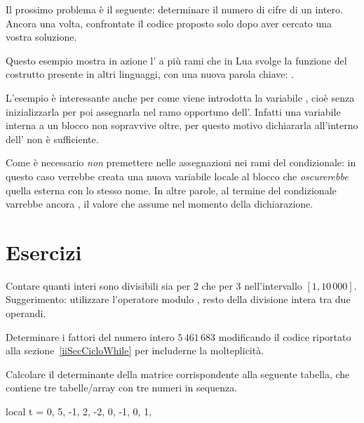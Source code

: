 Il prossimo problema è il seguente: determinare il numero di cifre di un
intero. Ancora una volta, confrontate il codice proposto solo dopo aver cercato
una vostra soluzione.

Questo esempio mostra in azione l' a più rami che in Lua svolge
la funzione del costrutto  presente in altri linguaggi, con una
nuova parola chiave: .

L'esempio è interessante anche per come viene introdotta la variabile
, cioè senza inizializzarla per poi assegnarla nel ramo opportuno
dell'. Infatti una variabile interna a un blocco non sopravvive oltre,
per questo motivo dichiararla all'interno dell' non è sufficiente.

Come è necessario \emph{non} premettere  nelle
assegnazioni nei rami del condizionale: in questo caso verrebbe creata una nuova
variabile locale al blocco che \emph{oscurerebbe} quella esterna con lo stesso
nome. In altre parole, al termine del condizionale  varrebbe ancora
, il valore che assume nel momento della dichiarazione.


\section{Esercizi}

\begin{Exercise}[label=cos-01]
Contare quanti interi sono divisibili sia per 2 che per 3 nell'intervallo \( [1,
10\,000]\). Suggerimento: utilizzare l'operatore modulo \key{\%}, resto della
divisione intera tra due operandi.
\end{Exercise}

\begin{Exercise}[label=cos-02]
Determinare i fattori del numero intero \(5\,461\,683\) modificando il codice
riportato alla sezione~\ref{iiSecCicloWhile} per includerne la molteplicità.
\end{Exercise}

\begin{Exercise}[label=cos-03]
Calcolare il determinante della matrice corrispondente alla seguente tabella,
che contiene tre tabelle/array con tre numeri in sequenza.
\begin{lines}
local t = {
    { 0,  5, -1},
    { 2, -2,  0},
    {-1,  0,  1},
}
\end{lines}
\end{Exercise}

